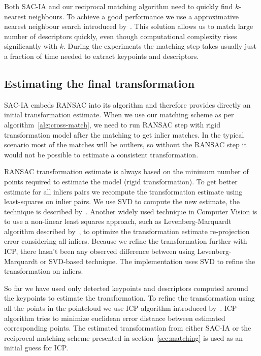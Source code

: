 Both \gls{SAC-IA} and our reciprocal matching algorithm need to quickly find $k$-nearest neighbours. To achieve a good performance we use a approximative nearest neighbour search introduced by~\citet{muja2014flann}. This solution allows us to match large number of descriptors quickly, even though computational complexity rises significantly with $k$. During the experiments the matching step takes usually just a fraction of time needed to extract keypoints and descriptors.

\subsection{Estimating the final transformation}
\label{sec:final-estimation}

\gls{SAC-IA} embeds \gls{RANSAC} into its algorithm and therefore provides directly an initial transformation estimate. When we use our matching scheme as per algorithm~\ref{alg:cross-match}, we need to run \gls{RANSAC} step with rigid transformation model after the matching to get inlier matches. In the typical scenario most of the matches will be outliers, so without the \gls{RANSAC} step it would not be possible to estimate a consistent transformation.

\gls{RANSAC} transformation estimate is always based on the minimum number of points required to estimate the model (rigid transformation). To get better estimate for all inliers pairs we recompute the transformation estimate using least-squares on inlier pairs. We use \gls{SVD} to compute the new estimate, the technique is described by~\citet{golub1970svd}. Another widely used technique in Computer Vision is to use a non-linear least squares approach, such as Levenberg-Marquardt algorithm described by~\citet{more1978levmarq}, to optimize the transformation estimate re-projection error considering all inliers. Because we refine the transformation further with \gls{ICP}, there hasn't been any observed difference between using Levenberg-Marquardt or \gls{SVD}-based technique. The implementation uses \gls{SVD} to refine the transformation on inliers.

So far we have used only detected keypoints and descriptors computed around the keypoints to estimate the transformation. To refine the transformation using all the points in the pointcloud we use \gls{ICP} algorithm introduced by~\citet{besl1992icp}. \gls{ICP} algorithm tries to minimize euclidean error distance between estimated corresponding points. The estimated transformation from either \gls{SAC-IA} or the reciprocal matching scheme presented in section~\ref{sec:matching} is used as an initial guess for \gls{ICP}.

